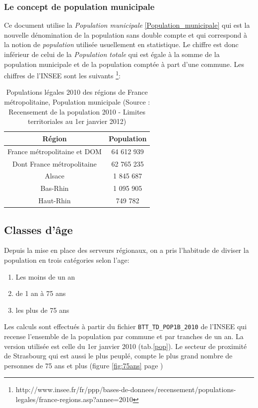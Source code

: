 \documentclass[12pt,english,french,twoside]{book}\usepackage[]{graphicx}\usepackage[]{color}
\providecommand{\tabularnewline}{\\} %
\begin{document}
\subsubsection{Le concept de population municipale}

Ce document utilise la \emph{Population municipale} \ref{Population_municipale}   qui est la nouvelle dénomination de la population sans double compte et qui correspond à la notion de \emph{population} utilisée usuellement en statistique.
Le chiffre est donc inférieur de celui de la \emph{Population totale} qui est égale à la somme de la population municipale et de la population comptée à part d'une commune.
Les chiffres de l'INSEE sont les suivants \footnote{http://www.insee.fr/fr/ppp/bases-de-donnees/recensement/populations-legales/france-regions.asp?annee=2010}:

\begin{table}
\begin{center}
\begin{tabular}{|c|c|}
\hline 
Région & Population\tabularnewline
\hline 
\hline 
France métropolitaine et DOM & 64 612 939\tabularnewline
\hline 
Dont France métropolitaine & 62 765 235\tabularnewline
\hline 
Alsace & 1 845 687\tabularnewline
\hline 
Bas-Rhin & 1 095 905\tabularnewline
\hline 
Haut-Rhin & 749 782\tabularnewline
\hline 
\end{tabular}
\caption[Populations légales 2010]{Populations légales 2010 des régions de France métropolitaine, Population
municipale (Source : Recensement de la population 2010 - Limites territoriales
au 1er janvier 2012) }
\label{pop2010}
\end{center}
\end{table}

\subsection{Classes d'âge}
Depuis la mise en place des serveurs régionaux, on a pris l'habitude de diviser la population en trois catégories selon l'age:
\begin{enumerate}
  \item Les moins de un an
  \item de 1 an à 75 ans
  \item les plus de 75 ans
\end{enumerate}

Les calculs sont effectués à partir du fichier \texttt{BTT\_TD\_POP1B\_2010} de l'INSEE qui recense l'ensemble de la population par commune et par tranches de un an. La version utilisée est celle du 1er janvier 2010 (tab.\ref{pop}). Le secteur de proximité de Strasbourg qui est aussi le plus peuplé, compte le plus grand nombre de personnes de 75 ans et plus (figure \ref{fig:75ans} page \pageref{fig:75ans})
\end{document}
